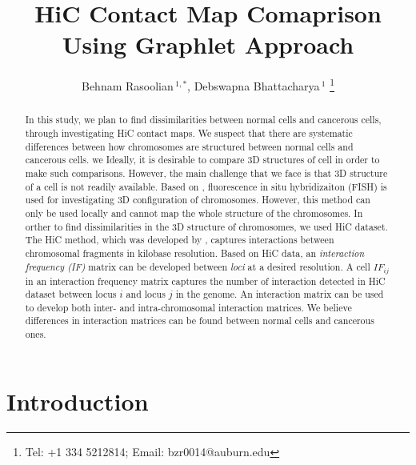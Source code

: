 \documentclass[a4,center,fleqn]{NAR}
\begin{document}
\title{HiC Contact Map Comaprison Using Graphlet Approach}

\author{%
    Behnam Rasoolian\,$^{1,*}$,
    Debswapna Bhattacharya\,$^{1}$
    \footnote{
    Tel: +1 334 5212814; Email: bzr0014@auburn.edu}}

    \address{%
        $^{1}$ Auburn University
        }


            \maketitle

\begin{abstract}

In this study, we plan to find dissimilarities between normal cells and cancerous cells,
through investigating HiC contact maps. 
We suspect that there are systematic differences between how chromosomes are structured
between normal cells and cancerous cells.
we 
Ideally, it is desirable to compare 3D structures of 
cell in order to make such comparisons.
However, the main challenge that we face is that 
3D structure of a cell is not readily available. Based on
\cite{adhikari2016chromosome3d}, fluorescence in situ hybridizaiton
(FISH) is used for investigating 3D configuration of chromosomes.
However, this method can only be used locally and cannot map
the whole structure of the chromosomes.
In orther to find dissimilarities in the 3D structure of 
chromosomes, we used HiC dataset.
The HiC method, which was developed by \cite{lieberman2009comprehensive}, captures interactions between 
chromosomal fragments in kilobase resolution. Based on HiC data, an
\textit{interaction frequency (IF) } matrix can be developed between \textit{loci} at a desired resolution.
A cell $IF_{ij}$ in an interaction frequency matrix captures the number of interaction detected
in HiC dataset between locus $i$ and locus $j$ in the genome.
An interaction matrix can be used to develop both inter- and intra-chromosomal interaction matrices.
We believe differences in interaction matrices can be found between normal cells and cancerous ones.
\end{abstract}
\section{Introduction}
\end{document}
